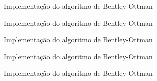\begin{frame}[fragile]{Implementação do algoritmo de Bentley-Ottman}
\end{frame}

\begin{frame}[fragile]{Implementação do algoritmo de Bentley-Ottman}
\end{frame}

\begin{frame}[fragile]{Implementação do algoritmo de Bentley-Ottman}
\end{frame}

\begin{frame}[fragile]{Implementação do algoritmo de Bentley-Ottman}
\end{frame}

\begin{frame}[fragile]{Implementação do algoritmo de Bentley-Ottman}
\end{frame}
